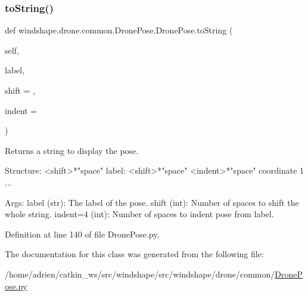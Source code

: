 \subsubsection{\texorpdfstring{to\+String()}{toString()}}
{\footnotesize\ttfamily def windshape.\+drone.\+common.\+Drone\+Pose.\+Drone\+Pose.\+to\+String (\begin{DoxyParamCaption}\item[{}]{self,  }\item[{}]{label,  }\item[{}]{shift = {},  }\item[{}]{indent = {} }\end{DoxyParamCaption})}

\begin{DoxyVerb}Returns a string to display the pose.

Structure:
    <shift>*"space" label:
    <shift>*"space" <indent>*"space" coordinate 1
    ...

Args:
    label (str): The label of the pose.
    shift (int): Number of spaces to shift the whole string.
    indent=4 (int): Number of spaces to indent pose from label.
\end{DoxyVerb}
 

Definition at line 140 of file Drone\+Pose.\+py.



The documentation for this class was generated from the following file\+:\begin{DoxyCompactItemize}
\item 
/home/adrien/catkin\+\_\+ws/src/windshape/src/windshape/drone/common/\mbox{\hyperlink{_drone_pose_8py}{Drone\+Pose.\+py}}\end{DoxyCompactItemize}
